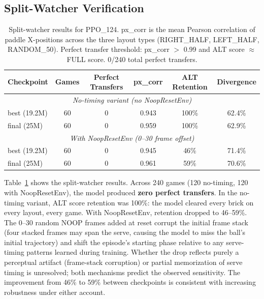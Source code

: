 \documentclass[11pt]{article}
\begin{document}
\subsection{Split-Watcher Verification}
\label{sec:split}

\begin{table}[h]
\centering
\begin{tabular}{lccccc}
\toprule
\textbf{Checkpoint} & \textbf{Games} & \textbf{Perfect Transfers} &
\textbf{px\_corr} & \textbf{ALT Retention} & \textbf{Divergence} \\
\midrule
\multicolumn{6}{c}{\textit{No-timing variant (no NoopResetEnv)}} \\
\midrule
best (19.2M) & 60 & 0 & 0.943 & 100\% & 62.4\% \\
final (25M)  & 60 & 0 & 0.959 & 100\% & 62.9\% \\
\midrule
\multicolumn{6}{c}{\textit{With NoopResetEnv (0--30 frame offset)}} \\
\midrule
best (19.2M) & 60 & 0 & 0.945 & 46\% & 71.4\% \\
final (25M)  & 60 & 0 & 0.961 & 59\% & 70.6\% \\
\bottomrule
\end{tabular}
\caption{Split-watcher results for PPO\_124. px\_corr is the mean Pearson
correlation of paddle X-positions across the three layout types (RIGHT\_HALF,
LEFT\_HALF, RANDOM\_50). Perfect transfer threshold: px\_corr $>$ 0.99 and
ALT score $\approx$ FULL score. 0/240 total perfect transfers.}
\label{tab:split}
\end{table}

Table~\ref{tab:split} shows the split-watcher results. Across 240 games (120
no-timing, 120 with NoopResetEnv), the model produced \textbf{zero perfect
transfers}. In the no-timing variant, ALT score retention was 100\%: the model
cleared every brick on every layout, every game. With NoopResetEnv, retention
dropped to 46--59\%. The 0--30 random NOOP frames added at reset corrupt the
initial frame stack (four stacked frames may span the serve, causing the model
to miss the ball's initial trajectory) and shift the episode's starting phase
relative to any serve-timing patterns learned during training. Whether the drop
reflects purely a perceptual artifact (frame-stack corruption) or partial
memorization of serve timing is unresolved; both mechanisms predict the observed
sensitivity. The improvement from 46\% to 59\% between checkpoints is
consistent with increasing robustness under either account.
\end{document}
